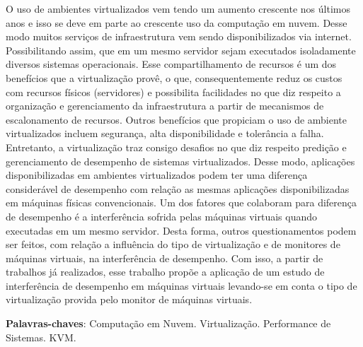 \begin{resumo}
 O uso de ambientes virtualizados vem tendo um aumento crescente nos últimos anos e isso se deve em parte ao crescente uso da computação em nuvem. Desse modo muitos serviços de infraestrutura vem sendo disponibilizados via internet. Possibilitando assim, que em um mesmo servidor sejam executados isoladamente diversos sistemas operacionais. Esse compartilhamento de recursos é um dos benefícios que a virtualização provê, o que, consequentemente reduz os custos com recursos físicos (servidores) e possibilita facilidades no que diz respeito a organização e gerenciamento da infraestrutura a partir de mecanismos de escalonamento de recursos. Outros benefícios que propiciam o uso de ambiente virtualizados incluem segurança, alta disponibilidade e tolerância a falha. Entretanto, a virtualização traz consigo desafios no que diz respeito predição e gerenciamento de desempenho de sistemas virtualizados. Desse modo, aplicações disponibilizadas em ambientes virtualizados podem ter uma diferença considerável de desempenho com relação as mesmas aplicações disponibilizadas em máquinas físicas convencionais. Um dos fatores que colaboram para diferença de desempenho é a interferência sofrida pelas máquinas virtuais quando executadas em um mesmo servidor. Desta forma, outros questionamentos podem ser feitos, com relação a influência  do tipo de virtualização e de monitores de máquinas virtuais, na interferência de desempenho. 
Com isso, a partir de trabalhos já realizados, esse trabalho propõe a aplicação de um estudo de interferência de desempenho em máquinas virtuais levando-se em conta o tipo de virtualização provida pelo monitor de máquinas virtuais. 





 \vspace{\onelineskip}
    
 \noindent
 \textbf{Palavras-chaves}: Computação em Nuvem. Virtualização. Performance de Sistemas. KVM.
\end{resumo}
